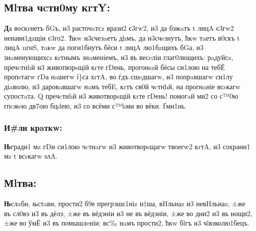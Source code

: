\subsection[Молитва честному кресту]
{Мlтва чcтн0му кrтY:}

\textbf{Д}а воскrнетъ бGъ, и3 расточaтсz врази2 є3гw2, и3 да бэжaтъ t лицA є3гw2
ненави1дzщіи є3го2. Ћкw и3счезaетъ дhмъ, да и3счeзнутъ, ћкw тaетъ в0скъ
t лицA nгнS, тaкw да поги1бнутъ бёси t лицA лю1бzщихъ бGа, и3
знaменующихсz кrтнымъ знaменіемъ, и3 въ весeліи глаг0лющихъ: рaдуйсz,
пречcтнhй и3 животворsщій кrте гDень, прогонszй бёсы си1лою на тебЁ
пропsтагw гDа нaшегw ї\}са хrтA, во ѓдъ сшeдшагw, и3 попрaвшагw си1лу
діaволю, и3 даровaвшагw нaмъ тебE, кrтъ св0й чcтнhй, на прогнaніе
всsкагw супостaта. Q пречcтнhй и3 животворsщій кrте гDень! помогaй ми2
со с™0ю гпcжeю дв7ою бцdею, и3 со всёми с™hми во вёки. Ґми1нь.

\subsubsection[Или кратко]{И\#ли крaткw:}

\textbf{Њ}гради1 мz гDи си1лою чcтнaгw и3 животворsщагw твоегw2 кrтA, и3 сохрани1
мz t всsкагw ѕлA.

\subsection[Молитва]{Мlтва:}

\textbf{Њ}слaби, њстaви, прости2 б9е прегрэшє1ніz н†ша, вHльнаz и3 невHльнаz, ±же
въ сл0вэ и3 въ дёлэ, ±же въ вёдэніи и3 не въ вёдэніи, ±же во дни2 и3 въ
нощи2, ±же во ўмЁ и3 въ помышлeніи: вс‰ нaмъ прости2, ћкw бlгъ и3
чlвэколю1бецъ.

